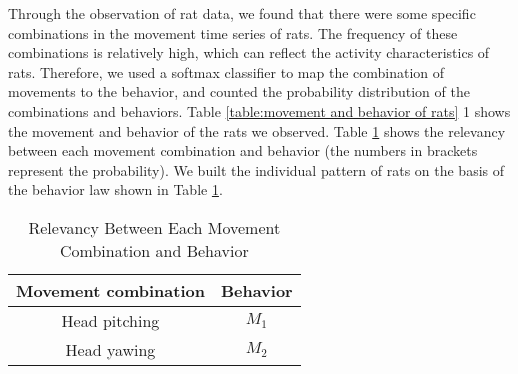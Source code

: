 Through the observation of rat data, we found that there were some specific
combinations in the movement time series of rats. The frequency of these
combinations is relatively high, which can reflect the activity characteristics
of rats. Therefore, we used a softmax classifier to map the combination of
movements to the behavior, and counted the probability distribution of the
combinations and behaviors. Table \ref{table:movement and behavior of rats} 1
shows the movement and behavior of the rats we observed.
Table \ref{table:relevancy between each movement combination and behavior} shows
the relevancy between each movement combination and behavior (the numbers in
brackets represent the probability). We built the individual pattern of rats on
the basis of the behavior law shown in Table
\ref{table:relevancy between each movement combination and behavior}.

\begin{table}[b]
    \caption{Relevancy Between Each Movement Combination and Behavior}
    \centering
    \begin{tabular}{cc}
            \hline
            Movement combination & Behavior \\
            \hline
            Head pitching & $M_1$ \\
            Head yawing & $M_2$ \\
            \hline
            \end{tabular}
    \label{table:relevancy between each movement combination and behavior}
\end{table}

